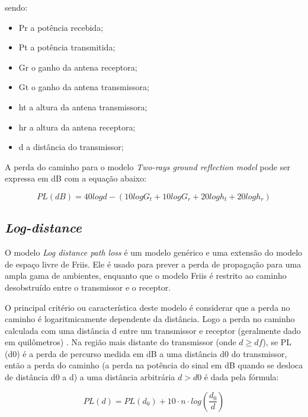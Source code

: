 \documentclass[
	12pt,				%
	openright,			%
	twoside,			%
	a4paper,			%
	english,			%
	french,				%
	spanish,			%
	brazil				%
	]{abntex2}
\begin{document}
sendo:

\begin{itemize}
	\item Pr a potência recebida;
	\item Pt a potência transmitida;
	\item Gr o ganho da antena receptora;
	\item Gt o ganho da antena transmissora;
	\item ht a altura da antena transmissora;
	\item hr a altura da antena receptora;
	\item d a distância do transmissor;
\end{itemize}

A perda do caminho para o modelo \textit{Two-rays ground reflection model} pode ser expressa em dB com a equação abaixo:


\begin{equation}
PL(dB) = 40 log d -(10 log G_{t} + 10 log G_{r} + 20 log h_{t} + 20 log h_{r})
\end{equation}

\subsection[Log-distance]{\textit{Log-distance}}

O modelo \textit{Log distance path loss} é um modelo genérico e uma extensão do modelo de espaço livre de Friis. Ele é usado para prever a perda de propagação para uma ampla gama de ambientes, enquanto que o modelo Friis é restrito ao caminho desobstruído entre o transmissor e o receptor.

O principal critério ou característica deste modelo é considerar que a perda no caminho é logaritmicamente dependente da distância. Logo a perda no caminho calculada com uma distância d entre um transmissor e receptor (geralmente dado em quilômetros) . Na região mais distante do transmissor (onde $d \geq df$), se PL (d0) é a perda de percurso medida em dB a uma distância d0 do transmissor, então a perda do caminho (a perda na potência do sinal em dB quando se desloca de distância d0 a d) a uma distância arbitrária $ d > d0 $ é dada pela fórmula:


\begin{equation}
PL(d) = PL(d_{0}) + 10 \cdot n \cdot log(\frac{d_{0}}{d})
\end{equation}
\end{document}
